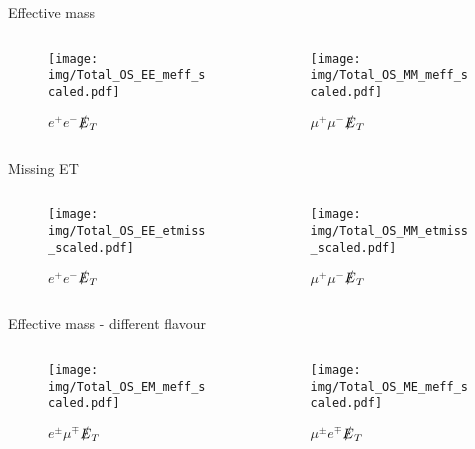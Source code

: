 \documentclass{beamer}
\begin{document}
\begin{frame}{Effective mass}
  \begin{columns}
    \begin{column}{0.45\textwidth}\begin{figure}
      \caption{$e^{+}e^{-}$$\slashed{E}_{T}$}
      \texttt{[image: img/Total\_OS\_EE\_meff\_scaled.pdf]}
    \end{figure}\end{column}
    \begin{column}{0.45\textwidth}\begin{figure}
      \caption{$\mu^{+}\mu^{-}$$\slashed{E}_{T}$}
      \texttt{[image: img/Total\_OS\_MM\_meff\_scaled.pdf]}
    \end{figure}\end{column}
  \end{columns}
\end{frame}

\begin{frame}{Missing ET}
  \begin{columns}
    \begin{column}{0.45\textwidth}\begin{figure}
      \caption{$e^{+}e^{-}$$\slashed{E}_{T}$}
      \texttt{[image: img/Total\_OS\_EE\_etmiss\_scaled.pdf]}
    \end{figure}\end{column}
    \begin{column}{0.45\textwidth}\begin{figure}
      \caption{$\mu^{+}\mu^{-}$$\slashed{E}_{T}$}
      \texttt{[image: img/Total\_OS\_MM\_etmiss\_scaled.pdf]}
    \end{figure}\end{column}
  \end{columns}
\end{frame}

\begin{frame}{Effective mass - different flavour}
  \begin{columns}
    \begin{column}{0.45\textwidth}\begin{figure}
      \caption{$e^{\pm}\mu^{\mp}$$\slashed{E}_{T}$}
      \texttt{[image: img/Total\_OS\_EM\_meff\_scaled.pdf]}
    \end{figure}\end{column}
    \begin{column}{0.45\textwidth}\begin{figure}
      \caption{$\mu^{\pm}e^{\mp}$$\slashed{E}_{T}$}
      \texttt{[image: img/Total\_OS\_ME\_meff\_scaled.pdf]}
    \end{figure}\end{column}
  \end{columns}
\end{frame}
\end{document}
